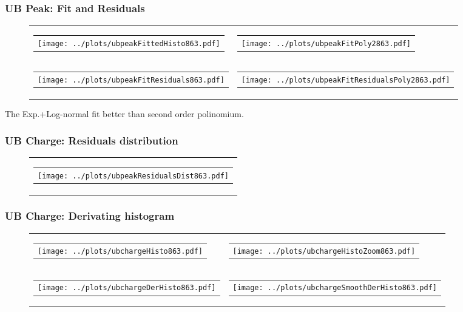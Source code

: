 \documentclass[aspectratio=169]{beamer}
\begin{document}
\begin{frame}
  \frametitle{UB Peak: Fit and Residuals}
  \begin{figure}
    \centering
    \begin{tabularx}{\textwidth}{CC}
      \begin{tabular}{l}
        \texttt{[image: ../plots/ubpeakFittedHisto863.pdf]}
      \end{tabular}
      &
      \begin{tabular}{l}
        \texttt{[image: ../plots/ubpeakFitPoly2863.pdf]}
      \end{tabular}
      \\
      \begin{tabular}{l}
        \texttt{[image: ../plots/ubpeakFitResiduals863.pdf]}
      \end{tabular}
      &
      \begin{tabular}{l}
        \texttt{[image: ../plots/ubpeakFitResidualsPoly2863.pdf]}
      \end{tabular}
    \end{tabularx}
  \end{figure}
  The Exp.+Log-normal fit better than second order polinomium.
\end{frame}


\begin{frame}
  \frametitle{UB Charge: Residuals distribution}
  \begin{figure}
    \centering
    \begin{tabularx}{\textwidth}{C}
      \begin{tabular}{l}
        \texttt{[image: ../plots/ubpeakResidualsDist863.pdf]}
      \end{tabular}
    \end{tabularx}
  \end{figure}
\end{frame}


\begin{frame}
  \frametitle{UB Charge: Derivating histogram} %
  \begin{figure}
    \centering
    \begin{tabularx}{\textwidth}{CC}
      \begin{tabular}{l}
        \texttt{[image: ../plots/ubchargeHisto863.pdf]}
      \end{tabular}
      &
      \begin{tabular}{l}
        \texttt{[image: ../plots/ubchargeHistoZoom863.pdf]}
      \end{tabular}
      \\
      \begin{tabular}{l}
        \texttt{[image: ../plots/ubchargeDerHisto863.pdf]}
      \end{tabular}
      &
      \begin{tabular}{l}
        \texttt{[image: ../plots/ubchargeSmoothDerHisto863.pdf]}
      \end{tabular}
    \end{tabularx}
  \end{figure}
\end{frame}
\end{document}
